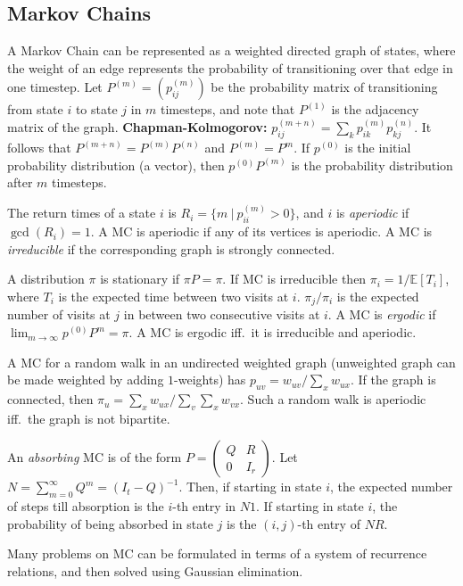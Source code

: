 \documentclass[15pt,a4paper]{article}
\begin{document}
\begin{landscape}
\begin{multicols*}{3}
\subsection{Markov Chains}
A Markov Chain can be represented as a weighted directed graph of
states, where the weight of an edge represents the probability of
transitioning over that edge in one timestep. Let $P^{(m)} = (p^{(m)}_{ij})$
be the probability matrix of transitioning from state $i$ to state $j$
in $m$ timesteps, and note that $P^{(1)}$ is the adjacency matrix of
the graph. \textbf{Chapman-Kolmogorov:} $p^{(m+n)}_{ij} = \sum_{k}
p^{(m)}_{ik} p^{(n)}_{kj}$. It follows that $P^{(m+n)} =
P^{(m)}P^{(n)}$ and $P^{(m)} = P^m$. If $p^{(0)}$ is the initial
probability distribution (a vector), then $p^{(0)}P^{(m)}$ is the
probability distribution after $m$ timesteps.

The return times of a state $i$ is $R_i = \{m\ |\ p^{(m)}_{ii} > 0 \}$,
and $i$ is \textit{aperiodic} if $\gcd(R_i) = 1$. A MC is aperiodic if
any of its vertices is aperiodic. A MC is \textit{irreducible} if the
corresponding graph is strongly connected.

A distribution $\pi$ is stationary if $\pi P = \pi$. If MC is
irreducible then $\pi_i = 1/\mathbb{E}[T_i]$, where $T_i$ is the
expected time between two visits at $i$. $\pi_j/\pi_i$ is the expected
number of visits at $j$ in between two consecutive visits at $i$. A MC
is \textit{ergodic} if $\lim_{m\to\infty} p^{(0)} P^{m} = \pi$. A MC is
ergodic iff.\ it is irreducible and aperiodic.

A MC for a random walk in an undirected weighted graph (unweighted
graph can be made weighted by adding $1$-weights) has $p_{uv} =
w_{uv}/\sum_{x} w_{ux}$. If the graph is connected, then $\pi_u =
\sum_{x} w_{ux} / \sum_{v}\sum_{x} w_{vx}$. Such a random walk is
aperiodic iff.\ the graph is not bipartite.

An \textit{absorbing} MC is of the form $P = \left(\begin{matrix} Q & R
\\ 0 & I_r \end{matrix}\right)$. Let $N = \sum_{m=0}^\infty Q^m = (I_t
- Q)^{-1}$. Then, if starting in state $i$, the expected number of
steps till absorption is the $i$-th entry in $N1$. If starting in state
$i$, the probability of being absorbed in state $j$ is the $(i,j)$-th
entry of $NR$.

Many problems on MC can be formulated in terms of a system of
recurrence relations, and then solved using Gaussian elimination.


\end{multicols*}
\end{landscape}
\end{document}
